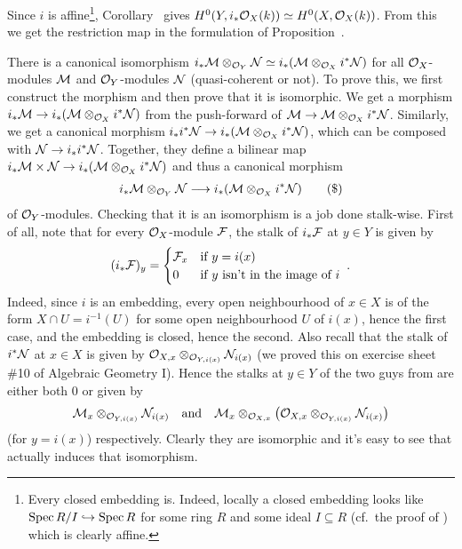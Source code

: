 \documentclass[a4paper,parskip=half,numbers=enddot, DIV=12]{scrreprt}
\begin{document}
\begin{rem}
\begin{alphanumerate}
		Since $i$ is affine\footnote{Every closed embedding is. Indeed, locally a closed embedding looks like $\Spec R/I\monomorphism\Spec R$ for some ring $R$ and some ideal $I\subseteq R$ (cf.\ the proof of \cite[Proposition~1.5.3]{alggeo1}) which is clearly affine.}, Corollary~ gives $H^0(Y,i_*\mathcal{O}_X(k))\simeq H^0(X,\mathcal{O}_X(k))$. From this we get the restriction map in the formulation of Proposition~.
		\item There is a canonical isomorphism $i_*\mathcal{M}\otimes_{\mathcal{O}_Y}\mathcal{N}\simeq  i_*(\mathcal{M}\otimes_{\mathcal{O}_X}i^*\mathcal{N})$ for all $\mathcal{O}_X$-modules $\mathcal{M}$ and $\mathcal{O}_Y$-modules $\mathcal{N}$ (quasi-coherent or not). To prove this, we first construct the morphism and then prove that it is isomorphic. We get a morphism $i_*\Mm\morphism i_*(\Mm\otimes_{\Oo_X}i^*\Nn)$ from the push-forward of $\Mm\morphism\Mm\otimes_{\Oo_X}i^*\Nn$. Similarly, we get a canonical morphism $i_*i^*\Nn\morphism i_*(\Mm\otimes_{\Oo_X}i^*\Nn)$, which can be composed with $\Nn\morphism i_*i^*\Nn$. Together, they define a bilinear map $i_*\Mm\times \Nn\morphism i_*(\Mm\otimes_{\Oo_X}i^*\Nn)$ and thus a canonical morphism
		\begin{align}\lbl{eq:i_*Iso}
			i_*\Mm\otimes_{\Oo_Y}\Nn\morphism i_*(\Mm\otimes_{\Oo_X}i^*\Nn)\tag{\$}
		\end{align}
		of $\mathcal{O}_Y$-modules. Checking that it is an isomorphism is a job done stalk-wise. First of all, note that for every $\mathcal{O}_X$-module $\mathcal{F}$, the stalk of $i_*\mathcal{F}$ at $y\in Y$ is given by
		\begin{align*}
			(i_*\mathcal{F})_y=\begin{cases}
				\mathcal{F}_x &\text{if }y=i(x)\\
				0 & \text{if }y\text{ isn't in the image of }i
			\end{cases}\;.
		\end{align*}
		Indeed, since $i$ is an embedding, every open neighbourhood of $x\in X$ is of the form $X\cap U=i^{-1}(U)$ for some open neighbourhood $U$ of $i(x)$, hence the first case, and the embedding is closed, hence the second. Also recall that the stalk of $i^*\mathcal{N}$ at $x\in X$ is given by $\mathcal{O}_{X,x}\otimes_{\mathcal{O}_{Y,i(x)}}\mathcal{N}_{i(x)}$ (we proved this on exercise sheet \#10 of Algebraic Geometry I). Hence the stalks at $y\in Y$ of the two guys from  are either both $0$ or given by 
		\begin{align*}
			\mathcal{M}_x\otimes_{\mathcal{O}_{Y,i(x)}}\mathcal{N}_{i(x)}\quad\text{and}\quad \mathcal{M}_x\otimes_{\mathcal{O}_{X,x}}\left(\mathcal{O}_{X,x}\otimes_{\mathcal{O}_{Y,i(x)}}\mathcal{N}_{i(x)}\right)
		\end{align*}
		(for $y=i(x)$) respectively. Clearly they are isomorphic and it's easy to see that  actually induces that isomorphism.
	\end{alphanumerate}
\end{rem}
\end{document}
